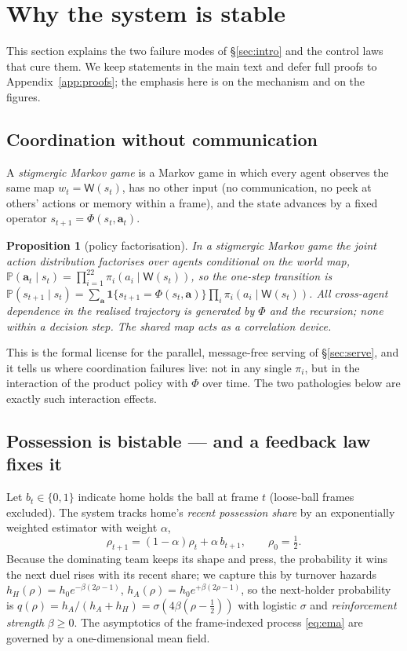 \documentclass[11pt]{article}
\newtheorem{proposition}{Proposition}
\theoremstyle{definition}
\theoremstyle{remark}
\newcommand{\Prob}{\mathbb{P}}
\newcommand{\Wmap}{\mathsf{W}}
\begin{document}
\section{Why the system is stable}\label{sec:why}

This section explains the two failure modes of \S\ref{sec:intro} and the control laws that cure them. We keep statements in the main text and defer full proofs to Appendix~\ref{app:proofs}; the emphasis here is on the mechanism and on the figures.

\subsection{Coordination without communication}\label{sec:stig}

A \emph{stigmergic Markov game} is a Markov game in which every agent observes the same map $w_t=\Wmap(s_t)$, has no other input (no communication, no peek at others' actions or memory within a frame), and the state advances by a fixed operator $s_{t+1}=\Phi(s_t,\mathbf a_t)$.

\begin{proposition}[policy factorisation]\label{prop:factor}
In a stigmergic Markov game the joint action distribution factorises over agents conditional on the world map, $\Prob(\mathbf a_t\mid s_t)=\prod_{i=1}^{22}\pi_i(a_i\mid\Wmap(s_t))$, so the one-step transition is $\Prob(s_{t+1}\mid s_t)=\sum_{\mathbf a}\mathbf1\{s_{t+1}=\Phi(s_t,\mathbf a)\}\prod_i\pi_i(a_i\mid\Wmap(s_t))$. All cross-agent dependence in the realised trajectory is generated by $\Phi$ and the recursion; none within a decision step. The shared map acts as a correlation device.
\end{proposition}

This is the formal license for the parallel, message-free serving of \S\ref{sec:serve}, and it tells us where coordination failures live: not in any single $\pi_i$, but in the interaction of the product policy with $\Phi$ over time. The two pathologies below are exactly such interaction effects.

\subsection{Possession is bistable --- and a feedback law fixes it}\label{sec:poss}

Let $b_t\in\{0,1\}$ indicate home holds the ball at frame $t$ (loose-ball frames excluded). The system tracks home's \emph{recent possession share} by an exponentially weighted estimator with weight $\alpha$,
\begin{equation}\label{eq:ema}
\rho_{t+1}=(1-\alpha)\rho_t+\alpha\,b_{t+1},\qquad\rho_0=\tfrac12 .
\end{equation}
Because the dominating team keeps its shape and press, the probability it wins the next duel rises with its recent share; we capture this by turnover hazards $h_H(\rho)=h_0e^{-\beta(2\rho-1)}$, $h_A(\rho)=h_0e^{+\beta(2\rho-1)}$, so the next-holder probability is $q(\rho)=h_A/(h_A+h_H)=\sigma(4\beta(\rho-\tfrac12))$ with logistic $\sigma$ and \emph{reinforcement strength} $\beta\ge0$. The asymptotics of the frame-indexed process \eqref{eq:ema} are governed by a one-dimensional mean field.
\end{document}
